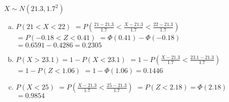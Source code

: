 \documentclass{article}%
\begin{document}
%
\normalsize%
\Large $ X \sim N(21.3, 1.7^2) $%
\begin{enumerate}[a)]%
\Large \item $P(21 < X < 22)$%
$=P\left(\frac{21-21.3}{1.7} < \frac{X-21.3}{1.7} < \frac{22-21.3}{1.7}\right)$%
$=P\left(-0.18 < Z < 0.41 \right)$%
$=\Phi\left( 0.41 \right) - \Phi\left( -0.18 \right)$%
$=0.6591 - 0.4286 = 0.2305 $%
\item $P(X > 23.1) = 1 - P(X < 23.1)$%
$=1-P\left(\frac{X-21.3}{1.7} < \frac{23.1-21.3}{1.7}\right)$%
$=1-P\left(Z < 1.06 \right)$%
$=1 - \Phi\left( 1.06 \right) =  0.1446 $%
\item $P(X < 25)$%
$=P\left(\frac{X-21.3}{1.7} < \frac{25-21.3}{1.7}\right)$%
$=P\left(Z < 2.18 \right)=\Phi\left( 2.18 \right)$%
$= 0.9854 $%
\end{enumerate}%
\end{document}
